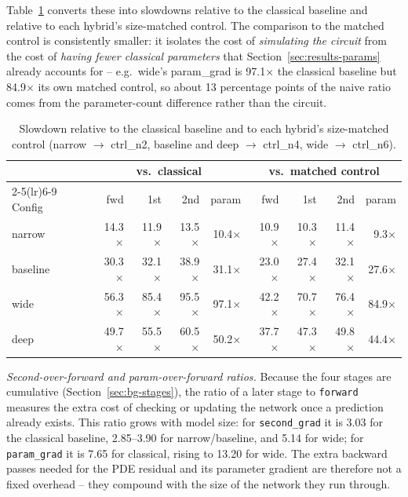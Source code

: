 Table~\ref{tab:slowdown} converts these into slowdowns relative to the classical baseline and relative to
each hybrid's size-matched control. The comparison to the matched control is consistently smaller: it
isolates the cost of \emph{simulating the circuit} from the cost of \emph{having fewer classical parameters}
that Section~\ref{sec:results-params} already accounts for -- e.g.\ wide's param\_grad is 97.1$\times$ the
classical baseline but 84.9$\times$ its own matched control, so about 13 percentage points of the naive
ratio comes from the parameter-count difference rather than the circuit.

\begin{table}[h]
\centering
\caption{Slowdown relative to the classical baseline and to each hybrid's size-matched control (narrow
$\to$ ctrl\_n2, baseline and deep $\to$ ctrl\_n4, wide $\to$ ctrl\_n6).}
\label{tab:slowdown}
\small
\begin{tabular}{@{}lrrrrrrrr@{}}
\toprule
& \multicolumn{4}{c}{vs.\ classical} & \multicolumn{4}{c}{vs.\ matched control} \\
\cmidrule(lr){2-5}\cmidrule(lr){6-9}
Config & fwd & 1st & 2nd & param & fwd & 1st & 2nd & param \\
\midrule
narrow   & 14.3$\times$ & 11.9$\times$ & 13.5$\times$ & 10.4$\times$ & 10.9$\times$ & 10.3$\times$ & 11.4$\times$ & 9.3$\times$ \\
baseline & 30.3$\times$ & 32.1$\times$ & 38.9$\times$ & 31.1$\times$ & 23.0$\times$ & 27.4$\times$ & 32.1$\times$ & 27.6$\times$ \\
wide     & 56.3$\times$ & 85.4$\times$ & 95.5$\times$ & 97.1$\times$ & 42.2$\times$ & 70.7$\times$ & 76.4$\times$ & 84.9$\times$ \\
deep     & 49.7$\times$ & 55.5$\times$ & 60.5$\times$ & 50.2$\times$ & 37.7$\times$ & 47.3$\times$ & 49.8$\times$ & 44.4$\times$ \\
\bottomrule
\end{tabular}
\end{table}

\emph{Second-over-forward and param-over-forward ratios.} Because the four stages are cumulative
(Section~\ref{sec:bg-stages}), the ratio of a later stage to \texttt{forward} measures the extra cost of
checking or updating the network once a prediction already exists. This ratio grows with model size: for
\texttt{second\_grad} it is 3.03 for the classical baseline, 2.85--3.90 for narrow/baseline, and 5.14 for
wide; for \texttt{param\_grad} it is 7.65 for classical, rising to 13.20 for wide. The extra backward passes
needed for the PDE residual and its parameter gradient are therefore not a fixed overhead -- they compound
with the size of the network they run through.


